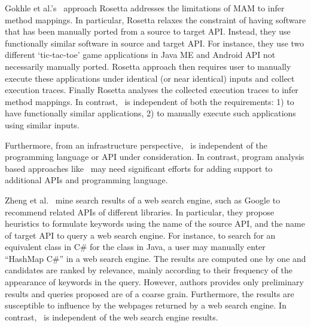 Gokhle et al.'s~\cite{Gokhale2013ICSE} approach Rosetta addresses
the limitations of MAM to infer method mappings.
In particular, Rosetta relaxes the constraint of having 
software that has been manually ported from a source to target API.
Instead, they use functionally similar software in source and target API.
For instance, they use two different `tic-tac-toe' game applications in Java ME and Android API not necessarily manually ported.
Rosetta approach then requires user to manually execute these applications under identical (or near identical) inputs and collect execution traces.
Finally Rosetta analyses the collected execution traces to infer method mappings.
In contrast, \tool\ is independent of both the requirements: 1) to have functionally similar applications, 2) to manually execute such applications using similar inputs.






Furthermore, from an infrastructure perspective, \tool\ is independent of the programming language or API under consideration. In contrast, program analysis based approaches like~\cite{Zhong2010ICSE,Gokhale2013ICSE,nguyen2014statistical} may need significant
efforts for adding support to additional APIs and programming language.

Zheng et al.~\cite{Zheng2011FSE} mine search results of a web search engine,
such as Google to recommend related APIs of different libraries. 
In particular, they propose heuristics to formulate keywords using the
name of the source API, and the name of target API to query a web search engine.
For instance, to search for an equivalent class in C\# for the  class in Java,
a user may manually enter ``HashMap C\#'' in a web search engine.
The results are computed one by one and candidates are ranked by relevance,
mainly according to their frequency of the appearance of keywords in the query.
However, authors provides only preliminary results and queries proposed are of a coarse grain. 
Furthermore, the results are susceptible to influence by the webpages returned by a web search engine.
In contrast, \tool\ is independent of the web search engine results. %





